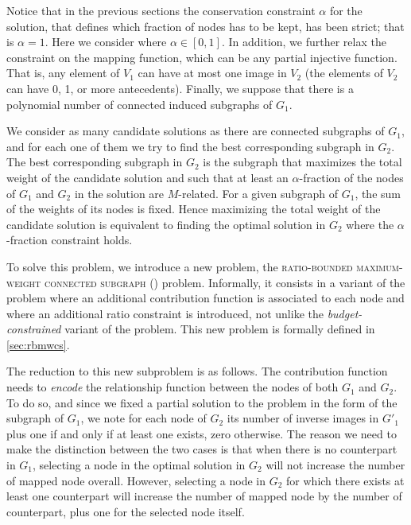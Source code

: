 			Notice that in the previous sections the conservation constraint $\alpha$ for the solution, that defines which fraction of nodes has to be kept, has been strict; that is $\alpha = 1$.
			Here we consider where $\alpha \in [0,1]$.
			In addition, we further relax the constraint on the mapping function, which can be any partial injective function.
			That is, any element of $V_1$ can have at most one image in $V_2$ (the elements of $V_2$ can have 0, 1, or more antecedents).
			Finally, we suppose that there is a polynomial number of connected induced subgraphs of $G_1$.

			We consider as many candidate solutions as there are connected subgraphs of $G_1$, and for each one of them we try to find the best corresponding subgraph in $G_2$.
			The best corresponding subgraph in $G_2$ is the subgraph that maximizes the total weight of the candidate solution and such that at least an $\alpha$-fraction of the nodes of $G_1$ and $G_2$ in the solution are $M$-related.
			For a given subgraph of $G_1$, the sum of the weights of its nodes is fixed.
			Hence maximizing the total weight of the candidate solution is equivalent to finding the optimal solution in $G_2$ where the $\alpha$-fraction constraint holds.

			To solve this problem, we introduce a new problem, the \textsc{ratio-bounded maximum-weight connected subgraph} (\rbmwcs) problem.
			Informally, it consists in a variant of the \mwcs{} problem where an additional contribution function is associated to each node and where an additional ratio constraint is introduced, not unlike the \emph{budget-constrained} variant of the \mwcs{} problem.
			This new problem is formally defined in \cref{sec:rbmwcs}.

			The reduction to this new subproblem is as follows.
			The contribution function needs to \emph{encode} the relationship function between the nodes of both $G_1$ and $G_2$.
			To do so, and since we fixed a partial solution to the problem in the form of the subgraph of $G_1$, we note for each node of $G_2$ its number of inverse images in $G'_1$ plus one if and only if at least one exists, zero otherwise.
			The reason we need to make the distinction between the two cases is that when there is no counterpart in $G_1$, selecting a node in the optimal solution in $G_2$ will not increase the number of mapped node overall.
			However, selecting a node in $G_2$ for which there exists at least one counterpart will increase the number of mapped node by the number of counterpart, plus one for the selected node itself.


